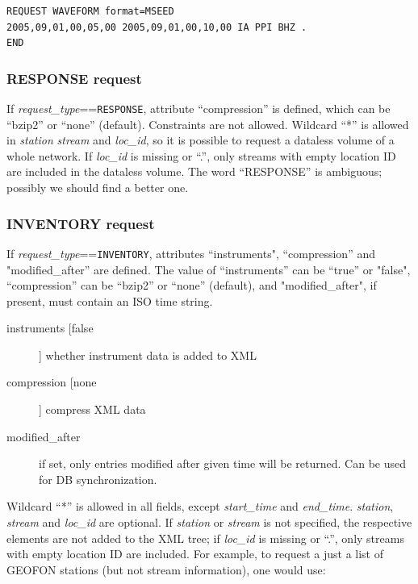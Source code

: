 \documentclass[11pt,a4paper,titlepage]{article}
\newcommand{\dfl}[1]{[#1]}
\begin{document}
\begin{verbatim}
REQUEST WAVEFORM format=MSEED
2005,09,01,00,05,00 2005,09,01,00,10,00 IA PPI BHZ .
END
\end{verbatim}


\subsubsection{RESPONSE request}

If \emph{request\_type}==\texttt{RESPONSE}, attribute ``compression'' is
defined, which can be ``bzip2'' or ``none'' (default). Constraints are not
allowed.  Wildcard ``*'' is allowed in \emph{station} \emph{stream} and
\emph{loc\_id}, so it is possible to request a dataless volume of a whole
network. If \emph{loc\_id} is missing or ``.'', only streams with empty
location ID are included in the dataless volume. The word ``RESPONSE'' is
ambiguous; possibly we should find a better one.


\subsubsection{INVENTORY request}

If \emph{request\_type}==\texttt{INVENTORY}, attributes ``instruments",
``compression'' and "modified\_after'' are defined. The value of
``instruments'' can be ``true'' or "false", ``compression'' can be
``bzip2'' or ``none'' (default), and "modified\_after", if present, must
contain an ISO time string.

\begin{description}
\item[instruments \dfl{false}] whether instrument data is added to XML
\item[compression \dfl{none}] compress XML data
\item[modified\_after] if set, only entries modified after given time will be
    returned. Can be used for DB synchronization.
\end{description}

Wildcard ``*'' is allowed in all fields, except \emph{start\_time} and
\emph{end\_time}.  \emph{station}, \emph{stream} and \emph{loc\_id} are
optional. If \emph{station} or \emph{stream} is not specified, the
respective elements are not added to the XML tree; if \emph{loc\_id} is
missing or ``.'', only streams with empty location ID are included. For
example, to request a just a list of GEOFON stations (but not stream
information), one would use:
\end{document}
